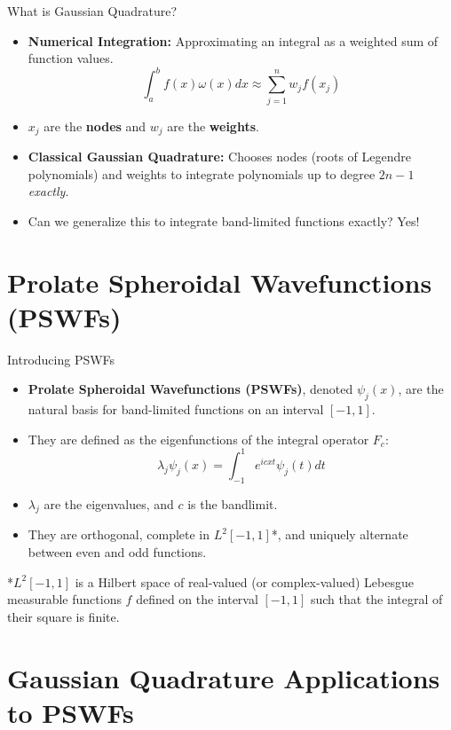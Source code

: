 \documentclass[10pt]{beamer}
\begin{document}
\begin{frame}{What is Gaussian Quadrature?}
    \begin{itemize}
        \item \textbf{Numerical Integration:} Approximating an integral as a weighted sum of function values.
        $$ \int_{a}^{b} f(x) \omega(x) dx \approx \sum_{j=1}^{n} w_j f(x_j) $$
        \item $x_j$ are the \textbf{nodes} and $w_j$ are the \textbf{weights}.
        \item \textbf{Classical Gaussian Quadrature:} Chooses nodes (roots of Legendre polynomials) and weights to integrate polynomials up to degree $2n-1$ \textit{exactly}.
        \item Can we generalize this to integrate band-limited functions exactly? Yes!
    \end{itemize}
\end{frame}

\section{Prolate Spheroidal Wavefunctions (PSWFs)}

\begin{frame}{Introducing PSWFs}
    \begin{itemize}
        \item \textbf{Prolate Spheroidal Wavefunctions (PSWFs)}, denoted $\psi_j(x)$, are the natural basis for band-limited functions on an interval $[-1, 1]$.
        \item They are defined as the eigenfunctions of the integral operator $F_c$:
        $$ \lambda_j \psi_j(x) = \int_{-1}^{1} e^{icxt} \psi_j(t) dt $$
        \item $\lambda_j$ are the eigenvalues, and $c$ is the bandlimit.
        \item They are orthogonal, complete in $L^2[-1,1]$*, and uniquely alternate between even and odd functions.
    \end{itemize}
*\(L^2[-1,1]\) is a Hilbert space of real-valued (or complex-valued) Lebesgue measurable functions \(f\) defined on the interval \([-1,1]\) such that the integral of their square is finite.
\end{frame}


\section{Gaussian Quadrature Applications to PSWFs}
\end{document}
